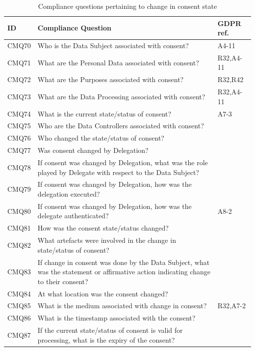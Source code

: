 \begin{table}
\small
\centering
\caption{Compliance questions pertaining to change in consent state}\label{table:info:compliance-change-consent}
\begin{tabularx}{\textwidth}{|l|X|l|}
\hline
\textbf{ID} & \textbf{Compliance Question} & \textbf{GDPR ref.} \\ \hline

CMQ70 & Who is the Data Subject associated with consent? & A4-11 \\ \hline
CMQ71 & What are the Personal Data associated with consent? & R32,A4-11 \\ \hline
CMQ72 & What are the Purposes associated with consent? & R32,R42 \\ \hline
CMQ73 & What are the Data Processing associated with consent? & R32,A4-11 \\ \hline
CMQ74 & What is the current state/status of consent? & A7-3 \\ \hline
CMQ75 & Who are the Data Controllers associated with consent? &  \\ \hline
CMQ76 & Who changed the state/status of consent? &  \\ \hline
CMQ77 & Was consent changed by Delegation? &  \\ \hline
CMQ78 & If consent was changed by Delegation, what was the role played by Delegate with respect to the Data Subject? &  \\ \hline
CMQ79 & If consent was changed by Delegation, how was the delegation executed? &  \\ \hline
CMQ80 & If consent was changed by Delegation, how was the delegate authenticated? & A8-2 \\ \hline
CMQ81 & How was the consent state/status changed? &  \\ \hline
CMQ82 & What artefacts were involved in the change in state/status of consent? &  \\ \hline
CMQ83 & If change in consent was done by the Data Subject, what was the statement or affirmative action indicating change to their consent? &  \\ \hline
CMQ84 & At what location was the consent changed? &  \\ \hline
CMQ85 & What is the medium associated with change in consent? & R32,A7-2 \\ \hline
CMQ86 & What is the timestamp associated with the consent? &  \\ \hline
CMQ87 & If the current state/status of consent is valid for processing, what is the expiry of the consent? &  \\ \hline
\end{tabularx}
\end{table}
